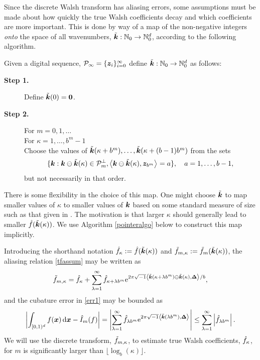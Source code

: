\documentclass[graybox,footinfo]{svmult}
\newcommand{\N}{\mathbb{N}} %
\newcommand{\bszero}{\boldsymbol{0}} %
\newcommand{\bsx}{\boldsymbol{x}}    %
\newcommand{\bsz}{\boldsymbol{z}}    %
\newcommand{\bsDelta}{\boldsymbol{\Delta}}    %
\begin{document}
Since the discrete Walsh transform has aliasing errors, some assumptions must be made about how quickly the true Walsh coefficients decay and which coefficients are more important.  This is done by way of a map of the non-negative integers \emph{onto} the space of all wavenumbers, $\tvk: \N_0 \to \N_0^d$, according to the following algorithm. 
\begin{algo} \label{wavenummapalgo} Given a digital sequence, $\cp_{\infty} = \{\bsz_i\}_{i=0}^{\infty}$ define $\tvk: \N_0 \to \N_0^d$ as follows:
\begin{description}
\item[\textbf{Step 1.}] Define $\tvk(0)=\bszero$.

\item[\textbf{Step 2.}] For $m=0, 1, \ldots$ \\
\hspace*{1.3cm} For $\kappa = 1, \ldots, b^{m} -1 $ \\
\hspace*{1.6cm} Choose the values of $\tilde{\boldsymbol{k}}(\kappa+b^{m}), \ldots, \tilde{\boldsymbol{k}}(\kappa+(b-1)b^{m})$ from the sets
\[
\{\bsk : \bsk \ominus \tvk(\kappa) \in \cp_{m}^{\perp}, \ip{\bsk \ominus \tvk(\kappa)}{\bsz_{b^m}}=a \}, \quad a=1, \ldots, b-1,
\]
\hspace*{1.6cm} but not necessarily in that order.
\end{description}
\end{algo}

There is some flexibility in the choice of this map.  One might choose $\tilde{\boldsymbol{k}}$ to map smaller values of $\kappa$ to smaller values of $\boldsymbol{k}$ based on some standard measure of size such as that given in \cite[(5.9)]{DicPil10a}. The motivation is that larger $\kappa$ should generally lead to smaller $\hat{f}(\tilde{\boldsymbol{k}}(\kappa))$.  We use Algorithm \ref{pointeralgo} below to construct this map implicitly.

Introducing the shorthand notation $\hat{f}_{\kappa} :=\hat{f}(\tilde{\boldsymbol{k}}(\kappa))$  and $\tilde{f}_{m,\kappa} := \tilde{f}_m(\tilde{\boldsymbol{k}}(\kappa))$, the aliasing relation \eqref{tfassum} may be written as  \begin{equation}
\tf_{m,\kappa} = \hf_{\kappa} + \sum_{\lambda=1}^{\infty} \hf_{\kappa+\lambda b^{m}} \E^{2 \pi \sqrt{-1} \ip{\tvk(\kappa+\lambda b^{m}) \ominus \tvk(\kappa)}{\bsDelta}/b},
\label{tfassumc}
\end{equation}
and the cubature error in \eqref{err1} may be bounded as 
\begin{equation}
\biggabs{ \int_{\cube} f(\bsx) \, \D \bsx - \hI_m(f)} 
= \Biggabs {\sum_{\lambda=1}^{\infty} \hf_{\lambda b^m} \E^{2 \pi \sqrt{-1} \ip{\tvk(\lambda b^m)}{\bsDelta}}}
\le \sum_{\lambda=1}^{\infty} \left \lvert \hf_{\lambda b^m}\right \rvert. \label{err2}
\end{equation}
We will use the discrete transform, $\tilde{f}_{m,\kappa}$, to estimate true Walsh coefficients, $\hat{f}_{\kappa}$, for $m$ is significantly larger than $\lfloor \log_b(\kappa) \rfloor$.
\end{document}
